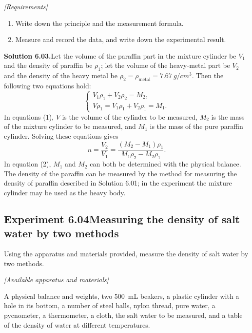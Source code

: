 \noindent\textit{[Requirements]}
\begin{enumerate}[label=(\arabic*),leftmargin=2.2em,itemsep=1pt,topsep=2pt]
\item Write down the principle and the measurement formula.
\item Measure and record the data, and write down the experimental result.
\end{enumerate}

\medskip
\noindent\textbf{Solution 6.03.}\quad Let the volume of the paraffin part in the mixture cylinder be $V_1$ and the density of paraffin be $\rho_1$; let the volume of the heavy-metal part be $V_2$ and the density of the heavy metal be $\rho_2=\rho_{\text{metal}}=\SI{7.67}{g/cm^3}$. Then the following two equations hold:
\begin{equation}\tag{1}
\begin{cases}
V_1\rho_1+V_2\rho_2=M_2,\\[2pt]
V\rho_1=V_1\rho_1+V_2\rho_1=M_1.
\end{cases}
\end{equation}
In equations (1), $V$ is the volume of the cylinder to be measured, $M_2$ is the mass of the mixture cylinder to be measured, and $M_1$ is the mass of the pure paraffin cylinder. Solving these equations gives
\begin{equation}\tag{2}
n=\frac{V_2}{V_1}=\frac{(M_2-M_1)\rho_1}{M_1\rho_2-M_2\rho_1}.
\end{equation}
In equation (2), $M_1$ and $M_2$ can both be determined with the physical balance. The density of the paraffin can be measured by the method for measuring the density of paraffin described in Solution 6.01; in the experiment the mixture cylinder may be used as the heavy body.

\subsection*{Experiment 6.04\quad Measuring the density of salt water by two methods}

Using the apparatus and materials provided, measure the density of salt water by two methods.

\noindent\textit{[Available apparatus and materials]}

A physical balance and weights, two \SI{500}{mL} beakers, a plastic cylinder with a hole in its bottom, a number of steel balls, nylon thread, pure water, a pycnometer, a thermometer, a cloth, the salt water to be measured, and a table of the density of water at different temperatures.

